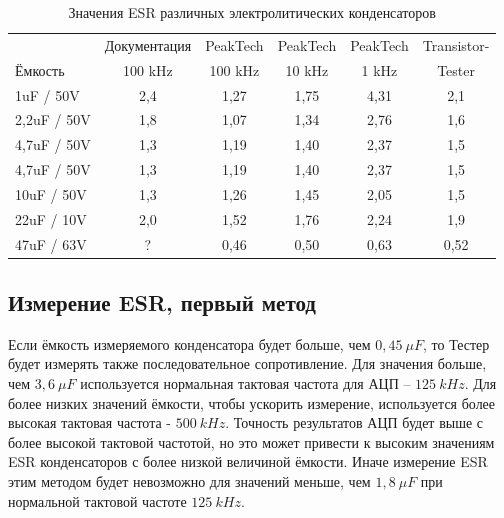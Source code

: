 \begin{table}[H]
  \begin{center}
    \begin{tabular}{| l | c | c | c | c | c |}
   \hline
            &Документация& PeakTech  & PeakTech & PeakTech & Transistor- \\
 Ёмкость    & 100 kHz    & 100 kHz   & 10 kHz   & 1 kHz    & Tester  \\
    \hline
    \hline
1uF / 50V    & 2,4       & 1,27      & 1,75     & 4,31     &  2,1 \\
    \hline
2,2uF / 50V  & 1,8       & 1,07      & 1,34     & 2,76     &  1,6 \\
    \hline
4,7uF / 50V  & 1,3       & 1,19      & 1,40     & 2,37     &  1,5 \\
    \hline
4,7uF / 50V  & 1,3       & 1,19      & 1,40     & 2,37     &  1,5 \\
    \hline
10uF / 50V   & 1,3       & 1,26      & 1,45     & 2,05     &  1,5 \\
    \hline
22uF / 10V   & 2,0       & 1,52      & 1,76     & 2,24     &  1,9 \\
    \hline
47uF / 63V   & ?         & 0,46      & 0,50     & 0,63     &  0,52 \\
    \hline
    \end{tabular}
  \end{center}
  \caption{Значения ESR различных электролитических конденсаторов}
  \label{tab:capESR} 
\end{table}

\subsection{Измерение ESR, первый метод}
Если ёмкость измеряемого конденсатора будет больше, чем \(0,45~\mu F\), то Тестер будет измерять 
также последовательное сопротивление. 
Для значения больше, чем \(3,6~\mu F\) используется нормальная тактовая частота для АЦП – \(125~kHz\). 
Для более низких значений ёмкости, чтобы ускорить измерение, используется более высокая тактовая частота - \(500~kHz\). 
Точность результатов АЦП будет выше с более высокой тактовой частотой, но это может привести к высоким значениям 
ESR конденсаторов с более низкой величиной ёмкости. Иначе измерение ESR этим методом будет невозможно для значений 
меньше, чем \(1,8~\mu F\) при нормальной тактовой частоте \(125~kHz\).

